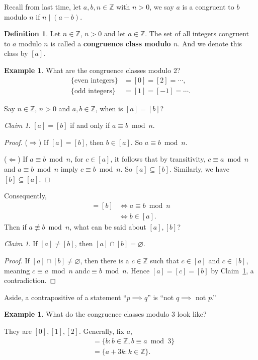 \documentclass{amsbook}
\theoremstyle{plain}
\theoremstyle{definition}
\newtheorem{definition}[theorem]{Definition}
\newtheorem{example}[theorem]{Example}
\theoremstyle{remark}
\newtheorem{claim}[theorem]{Claim}
\numberwithin{equation}{chapter}
\numberwithin{figure}{chapter}
\newcommand{\Z}{\mathbb{Z}}
\begin{document}
Recall from last time, let $a, b, n \in \Z$ with $n > 0$, we say $a$ is a congruent to $b$ modulo $n$ if $n \mid (a - b)$. \\[-4mm]
\begin{definition}
  Let $n \in \Z$, $n > 0$ and let $a \in \Z$. The set of all integers congruent to $a$ modulo $n$ is called a \textbf{congruence class modulo $n$}. And we denote  this class by $[a]$.
\end{definition}
\begin{example}
  What are the congruence classes modulo 2?
  \begin{align}
    \{\text{even integers}\} &= [0] = [2] = \cdots, \\
    \{\text{odd integers}\} &= [1] = [-1] = \cdots.
  \end{align}
\end{example}
Say $n \in \Z$, $n > 0$ and $a, b \in \Z$, when is $[a] = [b]$?
\begin{claim}\label{clm:clm1_day9}
  $[a] = [b]$ if and only if $a \equiv b \bmod n$.
\end{claim}
\begin{proof} ($\Rightarrow$) If $[a] = [b]$, then $b \in [a]$. So $a \equiv b \bmod n$.

  ($\Leftarrow$) If $a \equiv b \bmod n$, for $c \in [a]$, it follows that by transitivity, $c \equiv a \bmod n$ and $a \equiv b \bmod n$ imply $c \equiv b \bmod n$. So $[a] \subseteq [b]$. Similarly, we have $[b] \subseteq [a]$.
\end{proof}
Consequently,
\begin{align}
  [a] = [b] &\iff a \equiv b \bmod n \\
            &\iff b \in [a].
\end{align}
Then if $a \not\equiv b \bmod n$, what can be said about $[a], [b]$?
\begin{claim}
  If $[a] \neq [b]$, then $[a] \cap [b] = \varnothing$.
\end{claim}
\begin{proof}
  If $[a] \cap [b] \neq \varnothing$, then there is a $c \in \Z$ such that $c \in [a]$ and $c \in [b]$, meaning $c \equiv a \bmod n$ and$ c \equiv b \bmod n$. Hence $[a] = [c] = [b]$ by Claim~\ref{clm:clm1_day9}, a contradiction.
\end{proof}
Aside, a contrapositive of a statement ``$p \implies q$'' is ``not $ q \implies$ not $p$.''
\begin{example}
  What do the congruence classes modulo 3 look like?

  They are $[0], [1], [2]$. Generally, fix $a$,
  \begin{align}
    [a] &= \{ b : b \in \Z, b \equiv a \bmod 3 \} \\
        &= \{ a + 3k : k \in \Z \}.
  \end{align}
\end{example}
\end{document}
